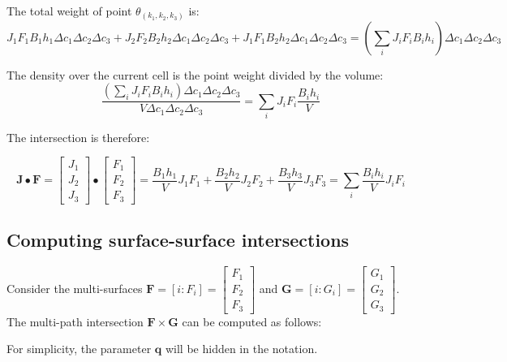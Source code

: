 The total weight of point \(\theta_{(k_1,k_2,k_3)}\) is: 
\[J_1 F_1 B_1 h_1 \Delta c_1 \Delta c_2 \Delta c_3 + J_2 F_2 B_2 h_2 \Delta c_1 \Delta c_2 \Delta c_3 + J_1 F_1 B_2 h_2 \Delta c_1 \Delta c_2 \Delta c_3 
= \left(\sum_i J_i F_i B_i h_i\right) \Delta c_1 \Delta c_2 \Delta c_3\]

The density over the current cell is the point weight divided by the volume:
\[\frac{\left(\sum_i J_i F_i B_i h_i\right) \Delta c_1 \Delta c_2 \Delta c_3}{V \Delta c_1 \Delta c_2 \Delta c_3} = \sum_i J_i F_i \frac{B_i h_i}{V}\]

The intersection is therefore:

\begin{thm}
\[\mathbf{J} \bullet \mathbf{F} = \begin{bmatrix} J_1 \\ J_2 \\ J_3 \end{bmatrix} \bullet \begin{bmatrix} F_1 \\ F_2 \\ F_3 \end{bmatrix} = \frac{B_1 h_1}{V} J_1 F_1 + \frac{B_2 h_2}{V} J_2 F_2 + \frac{B_3 h_3}{V} J_3 F_3 = \sum_i \frac{B_i h_i}{V} J_i F_i\]
\end{thm}



\subsection{Computing surface-surface intersections}

Consider the multi-surfaces \(\mathbf{F} = [i : F_i] = \begin{bmatrix} F_1 \\ F_2 \\ F_3 \end{bmatrix}\) and \(\mathbf{G} = [i : G_i] = \begin{bmatrix} G_1 \\ G_2 \\ G_3 \end{bmatrix}\). The multi-path intersection \(\mathbf{F} \times \mathbf{G}\) can be computed as follows:

For simplicity, the parameter \(\mathbf{q}\) will be hidden in the notation.

\vspace{1mm}

